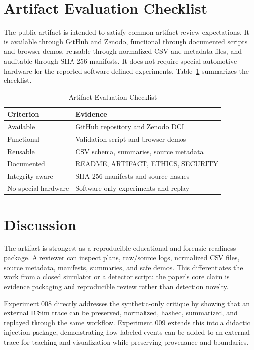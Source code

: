 \documentclass[conference]{IEEEtran}
\begin{document}
\section{Artifact Evaluation Checklist}
The public artifact is intended to satisfy common artifact-review expectations. It is available through GitHub and Zenodo, functional through documented scripts and browser demos, reusable through normalized CSV and metadata files, and auditable through SHA-256 manifests. It does not require special automotive hardware for the reported software-defined experiments. Table~\ref{tab:artifactcheck} summarizes the checklist.

\begin{table}[t]
\caption{Artifact Evaluation Checklist}
\label{tab:artifactcheck}
\centering
\footnotesize
\begin{tabular}{p{}p{}}
\toprule
Criterion & Evidence \\
\midrule
Available & GitHub repository and Zenodo DOI \\
Functional & Validation script and browser demos \\
Reusable & CSV schema, summaries, source metadata \\
Documented & README, ARTIFACT, ETHICS, SECURITY \\
Integrity-aware & SHA-256 manifests and source hashes \\
No special hardware & Software-only experiments and replay \\
\bottomrule
\end{tabular}
\end{table}

\section{Discussion}
The artifact is strongest as a reproducible educational and forensic-readiness package. A reviewer can inspect plans, raw/source logs, normalized CSV files, source metadata, manifests, summaries, and safe demos. This differentiates the work from a closed simulator or a detector script: the paper's core claim is evidence packaging and reproducible review rather than detection novelty.

Experiment 008 directly addresses the synthetic-only critique by showing that an external ICSim trace can be preserved, normalized, hashed, summarized, and replayed through the same workflow. Experiment 009 extends this into a didactic injection package, demonstrating how labeled events can be added to an external trace for teaching and visualization while preserving provenance and boundaries.
\end{document}
